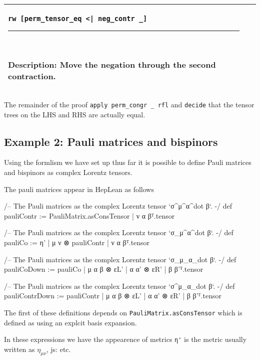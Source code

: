 \documentclass[a4paper, 11pt]{article}
\newcommand{\js}[1]{ {\color{magenta} js:  #1}}
\newcommand{\proofstep}[3]{
  \arrayrulecolor{mycolor}
\begin{center}
\begin{tabular}{|p{3in}| p{3in}|}
\hline
{#1
}\newline 
\hrule~\newline
#2
  & ~\newline
\makebox[3in]{%
#3}
  \\ \hline
\end{tabular}
\end{center}
\arrayrulecolor{black}
}
\begin{document}
\proofstep{\lstinline!rw [perm_tensor_eq <| neg_contr _]!}{
  Description: Move the negation through the second contraction.
}{
  \begin{tikzpicture}
    \node[draw=black] (A) at (0,0) {perm};
    \node[draw=red] (B) at (0,-1) {neg};
    \node[draw=red] (C) at (0,-2) {contr 0 0};
    \node[draw=black] (D) at (0,-3) {contr 0 1};
    \node[draw=black] (E) at (0,-4) {prod};
    \node[draw=black] (F1) at (-1,-5) {A};
    \node[draw=black] (F2) at (1,-5) {S};
    \path [->] (A) edge (B);
    \path [->, color = red] (B) edge (C);
    \path [->, color = red] (C) edge (D);
    \path [->] (D) edge (E);
    \path [->] (E) edge (F1);
    \path [->] (E) edge (F2);
  \end{tikzpicture}
}

The remainder of the proof \lstinline|apply perm_congr _ rfl| and \lstinline|decide| that the 
tensor trees on the LHS and RHS are actually equal.
\subsection{Example 2: Pauli matrices and bispinors} \label{sec:examplePauliBispinor}

Using the formlism we have set up thus far it is possible to define Pauli matrices and bispinors 
as complex Lorentz tensors.
 
The pauli matrices appear in HepLean as follows 
\begin{code}
/-- The Pauli matrices as the complex Lorentz tensor `σ^μ^α^{dot β}`. -/
def pauliContr := {PauliMatrix.asConsTensor | ν α β}ᵀ.tensor

/-- The Pauli matrices as the complex Lorentz tensor `σ_μ^α^{dot β}`. -/
def pauliCo := {η' | μ ν ⊗ pauliContr | ν α β}ᵀ.tensor

/-- The Pauli matrices as the complex Lorentz tensor `σ_μ_α_{dot β}`. -/
def pauliCoDown := {pauliCo | μ α β ⊗ εL' | α α' ⊗ εR' | β β'}ᵀ.tensor

/-- The Pauli matrices as the complex Lorentz tensor `σ^μ_α_{dot β}`. -/
def pauliContrDown := {pauliContr | μ α β ⊗ εL' | α α' ⊗ εR' | β β'}ᵀ.tensor
\end{code}
The first of these definitions depends on \lstinline|PauliMatrix.asConsTensor| which is defined as 
using an explcit basis expansion. 

In these expressions we have the appearence of metrics \lstinline|η'| is the metric usually written as 
$\eta_{\mu \nu}$, \js{etc.}
\end{document}
